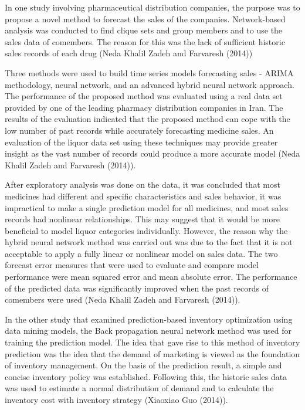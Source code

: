 \documentclass[]{elsarticle} %
\begin{document}
In one study involving pharmaceutical distribution companies, the
purpose was to propose a novel method to forecast the sales of the
companies. Network-based analysis was conducted to find clique sets and
group members and to use the sales data of comembers. The reason for
this was the lack of sufficient historic sales records of each drug
(Neda Khalil Zadeh and Farvaresh (2014))

Three methods were used to build time series models forecasting sales -
ARIMA methodology, neural network, and an advanced hybrid neural network
approach. The performance of the proposed method was evaluated using a
real data set provided by one of the leading pharmacy distribution
companies in Iran. The results of the evaluation indicated that the
proposed method can cope with the low number of past records while
accurately forecasting medicine sales. An evaluation of the liquor data
set using these techniques may provide greater insight as the vast
number of records could produce a more accurate model (Neda Khalil Zadeh
and Farvaresh (2014)).

After exploratory analysis was done on the data, it was concluded that
most medicines had different and specific characteristics and sales
behavior, it was impractical to make a single prediction model for all
medicines, and most sales records had nonlinear relationships. This may
suggest that it would be more beneficial to model liquor categories
individually. However, the reason why the hybrid neural network method
was carried out was due to the fact that it is not acceptable to apply a
fully linear or nonlinear model on sales data. The two forecast error
measures that were used to evaluate and compare model performance were
mean squared error and mean absolute error. The performance of the
predicted data was significantly improved when the past records of
comembers were used (Neda Khalil Zadeh and Farvaresh (2014)).

In the other study that examined prediction-based inventory optimization
using data mining models, the Back propagation neural network method was
used for training the prediction model. The idea that gave rise to this
method of inventory prediction was the idea that the demand of marketing
is viewed as the foundation of inventory management. On the basis of the
prediction result, a simple and concise inventory policy was
established. Following this, the historic sales data was used to
estimate a normal distribution of demand and to calculate the inventory
cost with inventory strategy (Xiaoxiao Guo (2014)).
\end{document}
